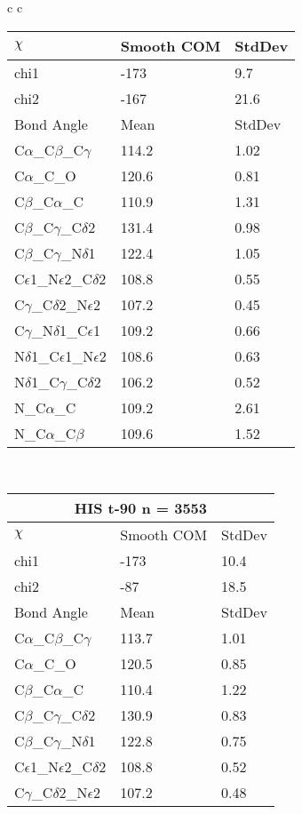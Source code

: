 \begin{longtable}{ c c }
\begin{tabular}{ l l l }
  $\chi$       & Smooth COM & StdDev \\ \midrule
  chi1 & -173 & 9.7 \\ 
  chi2 & -167 & 21.6 \\ \midrule
  Bond Angle   & Mean     & StdDev \\ \midrule
  C$\alpha$\_C$\beta$\_C$\gamma$ & 114.2 & 1.02\\
  C$\alpha$\_C\_O & 120.6 & 0.81\\
  C$\beta$\_C$\alpha$\_C & 110.9 & 1.31\\
  C$\beta$\_C$\gamma$\_C$\delta$2 & 131.4 & 0.98\\
  C$\beta$\_C$\gamma$\_N$\delta$1 & 122.4 & 1.05\\
  C$\epsilon$1\_N$\epsilon$2\_C$\delta$2 & 108.8 & 0.55\\
  C$\gamma$\_C$\delta$2\_N$\epsilon$2 & 107.2 & 0.45\\
  C$\gamma$\_N$\delta$1\_C$\epsilon$1 & 109.2 & 0.66\\
  N$\delta$1\_C$\epsilon$1\_N$\epsilon$2 & 108.6 & 0.63\\
  N$\delta$1\_C$\gamma$\_C$\delta$2 & 106.2 & 0.52\\
  N\_C$\alpha$\_C & 109.2 & 2.61\\
  N\_C$\alpha$\_C$\beta$ & 109.6 & 1.52\\
  \bottomrule
  \end{tabular}
  \\
  \begin{tabular}{ l l l }
  \toprule
  \multicolumn{3}{c}{HIS \textbf{t-90} n = 3553} \\ \toprule
  $\chi$       & Smooth COM & StdDev \\ \midrule
  chi1 & -173 & 10.4 \\ 
  chi2 & -87 & 18.5 \\ \midrule
  Bond Angle   & Mean     & StdDev \\ \midrule
  C$\alpha$\_C$\beta$\_C$\gamma$ & 113.7 & 1.01\\
  C$\alpha$\_C\_O & 120.5 & 0.85\\
  C$\beta$\_C$\alpha$\_C & 110.4 & 1.22\\
  C$\beta$\_C$\gamma$\_C$\delta$2 & 130.9 & 0.83\\
  C$\beta$\_C$\gamma$\_N$\delta$1 & 122.8 & 0.75\\
  C$\epsilon$1\_N$\epsilon$2\_C$\delta$2 & 108.8 & 0.52\\
  C$\gamma$\_C$\delta$2\_N$\epsilon$2 & 107.2 & 0.48\\

\end{tabular}
\end{longtable}
